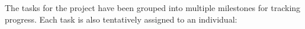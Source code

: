 \documentclass{article}
\begin{document}


The tasks for the project have been grouped into multiple milestones for tracking progress.  Each task is also tentatively assigned to an individual:
\end{document}
